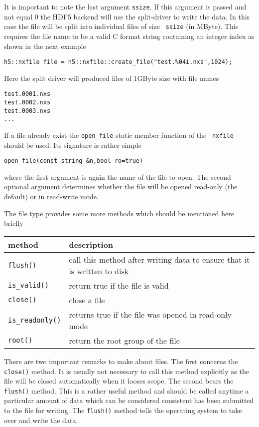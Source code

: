 It is important to note the last argument {\tt ssize}. If this argument is
passed and not equal $0$ the HDF5 backend will use the split-driver to write the
data. In this case the file will be split into individual files of size {\tt
ssize} (in MByte). This requires the file name to be a valid C format string
containing an integer index as shown in the next example
\begin{verbatim}
h5::nxfile file = h5::nxfile::create_file("test.%04i.nxs",1024);
\end{verbatim}
Here the split driver will produced files of $1$GByte size with file names
\begin{verbatim}
test.0001.nxs
test.0002.nxs
test.0003.nxs
...
\end{verbatim}
If a file already exist the {\tt open\_file} static member function of the {\tt
nxfile} should be used. 
Its signature is rather simple 
\begin{verbatim}
open_file(const string &n,bool ro=true)
\end{verbatim}
where the first argument is again the name of the file to open. The second
optional argument determines whether the file will be opened read-only (the
default) or in read-write mode. 

The file type provides some more methods which should be mentioned here briefly 
\begin{center}
\begin{tabular}{l|l}
method & description\\
\hline\hline
{\tt flush()} & call this method after writing data to ensure that it is written
to disk \\
\hline
{\tt is\_valid()} & return true if the file is valid \\
\hline
{\tt close()} & close a file \\
\hline
{\tt is\_readonly()} & returns true if the file was opened in read-only mode \\
\hline
{\tt root()} & return the root group of the file \\
\hline
\end{tabular}
\end{center}
There are two important remarks to make about files. The first concerns the {\tt
close()} method. It is usually not necessary to call this method explicitly as
the file will be closed automatically when it looses scope. 
The second bears the {\tt flush()} method. This is a rather useful method and
should be called anytime a particular amount of data which can be considered
consistent has been submitted to the file for writing. The {\tt flush()} method 
tells the operating system to take over and write the data.


